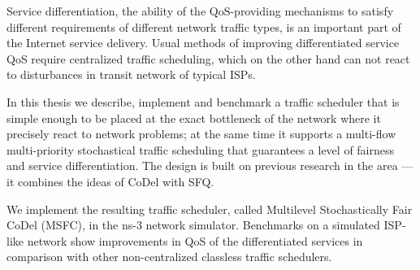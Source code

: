 Service differentiation, the ability of the QoS-providing mechanisms to satisfy different requirements of different network traffic types, is an important part of the Internet service delivery. Usual methods of improving differentiated service QoS require centralized traffic scheduling, which on the other hand can not react to disturbances in transit network of typical ISPs.

In this thesis we describe, implement and benchmark a traffic scheduler that is simple enough to be placed at the
exact bottleneck of the network where it precisely react to network problems; at the same time it
supports a multi-flow multi-priority stochastical traffic scheduling that guarantees a level of fairness and service differentiation. The design is built on previous research in the area --- it combines the ideas of CoDel with SFQ.  

We implement the resulting traffic scheduler, called Multilevel Stochastically Fair CoDel (MSFC), in the ns-3 network simulator. Benchmarks on a simulated ISP-like network show improvements in QoS of the differentiated services in comparison with other non-centralized classless traffic schedulers.
